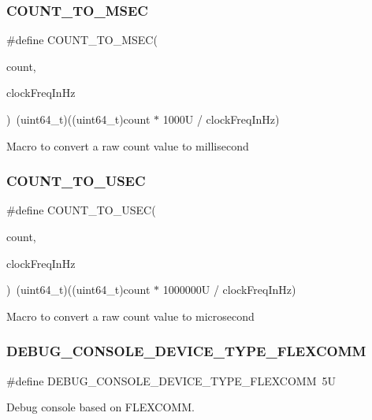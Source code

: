 \subsubsection{\texorpdfstring{COUNT\_TO\_MSEC}{COUNT\_TO\_MSEC}}
{\footnotesize\ttfamily \#define C\+O\+U\+N\+T\+\_\+\+T\+O\+\_\+\+M\+S\+EC(\begin{DoxyParamCaption}\item[{}]{count,  }\item[{}]{clock\+Freq\+In\+Hz }\end{DoxyParamCaption})~(uint64\+\_\+t)((uint64\+\_\+t)count $\ast$ 1000\+U / clock\+Freq\+In\+Hz)}

Macro to convert a raw count value to millisecond \mbox{\label{group__ksdk__common_ga601b69842ec962d1babd627e5a3541fd}} 
\subsubsection{\texorpdfstring{COUNT\_TO\_USEC}{COUNT\_TO\_USEC}}
{\footnotesize\ttfamily \#define C\+O\+U\+N\+T\+\_\+\+T\+O\+\_\+\+U\+S\+EC(\begin{DoxyParamCaption}\item[{}]{count,  }\item[{}]{clock\+Freq\+In\+Hz }\end{DoxyParamCaption})~(uint64\+\_\+t)((uint64\+\_\+t)count $\ast$ 1000000\+U / clock\+Freq\+In\+Hz)}

Macro to convert a raw count value to microsecond \mbox{\label{group__ksdk__common_gad4f7f7e51a84c34f06bbbb34973ae97a}} 
\subsubsection{\texorpdfstring{DEBUG\_CONSOLE\_DEVICE\_TYPE\_FLEXCOMM}{DEBUG\_CONSOLE\_DEVICE\_TYPE\_FLEXCOMM}}
{\footnotesize\ttfamily \#define D\+E\+B\+U\+G\+\_\+\+C\+O\+N\+S\+O\+L\+E\+\_\+\+D\+E\+V\+I\+C\+E\+\_\+\+T\+Y\+P\+E\+\_\+\+F\+L\+E\+X\+C\+O\+MM~5U}

Debug console based on F\+L\+E\+X\+C\+O\+MM. \mbox{\label{group__ksdk__common_ga75a9e86134df04f6a8b66025d11e25c2}} 
